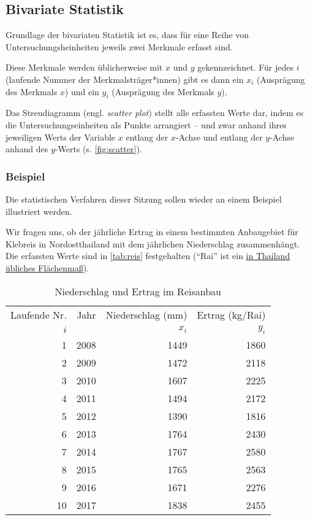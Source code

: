 \documentclass[
  ngerman,
]{article}
\begin{document}
\hypertarget{bivariate-statistik}{%
\subsection{Bivariate Statistik}\label{bivariate-statistik}}

Grundlage der bivariaten Statistik ist es, dass für eine Reihe von Untersuchungsheinheiten jeweils zwei Merkmale erfasst sind.

Diese Merkmale werden üblicherweise mit \(x\) und \(y\) gekennzeichnet. Für jedes \(i\) (laufende Nummer der Merkmalsträger*innen) gibt es dann ein \(x_i\) (Ausprägung des Merkmals \(x\)) und ein \(y_i\) (Ausprägung des Merkmals \(y\)).

Das Streudiagramm (engl. \emph{scatter plot}) stellt alle erfassten Werte dar, indem es die Untersuchungseinheiten als Punkte arrangiert -- und zwar anhand ihres jeweiligen Werts der Variable \(x\) entlang der \(x\)-Achse und entlang der \(y\)-Achse anhand des \(y\)-Werts (s. \autoref{fig:scatter}).

\hypertarget{beispiel-23}{%
\subsubsection{Beispiel}\label{beispiel-23}}

Die statistischen Verfahren dieser Sitzung sollen wieder an einem Beispiel illustriert werden.

Wir fragen uns, ob der jährliche Ertrag in einem bestimmten Anbaugebiet für Klebreis in Nordostthailand mit dem jährlichen Niederschlag zusammenhängt. Die erfassten Werte sind in \autoref{tab:reis} festgehalten (``Rai'' ist ein \href{https://de.wikipedia.org/wiki/Rai_(Einheit)}{in Thailand übliches Flächenmaß}).

\begin{table}

\caption{\label{tab:unnamed-chunk-18}\label{tab:reis}Niederschlag und Ertrag im Reisanbau}
\centering
\begin{tabular}[t]{rrrr}
\toprule
\multicolumn{1}{c}{Laufende Nr.} & \multicolumn{1}{c}{Jahr} & \multicolumn{1}{c}{Niederschlag (mm)} & \multicolumn{1}{c}{Ertrag (kg/Rai)} \\
\cmidrule(l{3pt}r{3pt}){1-1} \cmidrule(l{3pt}r{3pt}){2-2} \cmidrule(l{3pt}r{3pt}){3-3} \cmidrule(l{3pt}r{3pt}){4-4}
$i$ &  & $x_i$ & $y_i$\\
\midrule
1 & 2008 & 1449 & 1860\\
2 & 2009 & 1472 & 2118\\
3 & 2010 & 1607 & 2225\\
4 & 2011 & 1494 & 2172\\
5 & 2012 & 1390 & 1816\\
6 & 2013 & 1764 & 2430\\
7 & 2014 & 1767 & 2580\\
8 & 2015 & 1765 & 2563\\
9 & 2016 & 1671 & 2276\\
10 & 2017 & 1838 & 2455\\
\bottomrule
\end{tabular}
\end{table}
\end{document}
